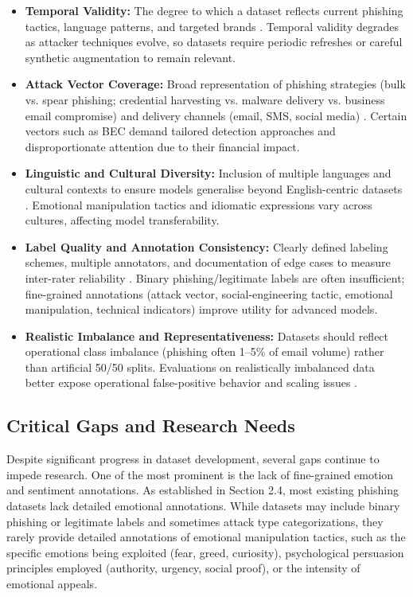 \begin{itemize}
    \item \textbf{Temporal Validity:} The degree to which a dataset reflects current phishing tactics, language patterns, and targeted brands \cite{sommer2010outside}. Temporal validity degrades as attacker techniques evolve, so datasets require periodic refreshes or careful synthetic augmentation to remain relevant.

    \item \textbf{Attack Vector Coverage:} Broad representation of phishing strategies (bulk vs.
    spear phishing; credential harvesting vs.
    malware delivery vs.
    business email compromise) and delivery channels (email, SMS, social media) \cite{ho2017detecting}. Certain vectors such as \ac{BEC} demand tailored detection approaches and disproportionate attention due to their financial impact.

    \item \textbf{Linguistic and Cultural Diversity:} Inclusion of multiple languages and cultural contexts to ensure models generalise beyond English-centric datasets \cite{komosny2025multilingual}. Emotional manipulation tactics and idiomatic expressions vary across cultures, affecting model transferability.

    \item \textbf{Label Quality and Annotation Consistency:} Clearly defined labeling schemes, multiple annotators, and documentation of edge cases to measure inter-rater reliability \cite{artstein2008intercoder}. Binary phishing/legitimate labels are often insufficient; fine-grained annotations (attack vector, social-engineering tactic, emotional manipulation, technical indicators) improve utility for advanced models.

    \item \textbf{Realistic Imbalance and Representativeness:} Datasets should reflect operational class imbalance (phishing often 1–5\% of email volume) rather than artificial 50/50 splits. Evaluations on realistically imbalanced data better expose operational false-positive behavior and scaling issues \cite{oest2019phishfarm}.
\end{itemize}


\subsection{Critical Gaps and Research Needs}

Despite significant progress in dataset development, several gaps continue to impede research. One of the most prominent is the lack of fine-grained emotion and sentiment annotations. As established in Section 2.4, most existing phishing datasets lack detailed emotional annotations. While datasets may include binary phishing or legitimate labels and sometimes attack type categorizations, they rarely provide detailed annotations of emotional manipulation tactics, such as the specific emotions being exploited (fear, greed, curiosity), psychological persuasion principles employed (authority, urgency, social proof), or the intensity of emotional appeals.


